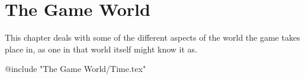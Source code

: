 \chapter{The Game World}

This chapter deals with some of the different aspects of the world the
game takes place in, as one in that world itself might know it as.

@include "The Game World/Time.tex"

